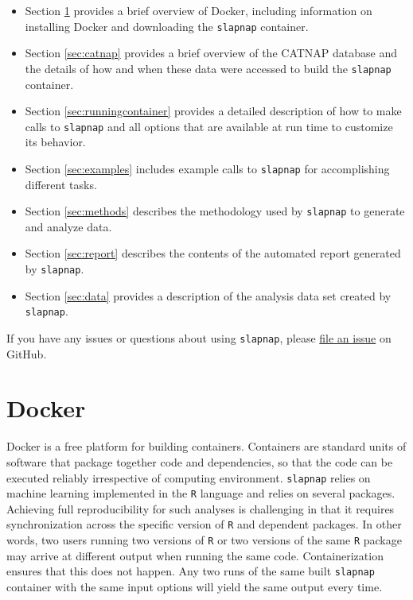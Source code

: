 \documentclass[]{article}
\providecommand{\tightlist}{%
  \setlength{\itemsep}{0pt}\setlength{\parskip}{0pt}}
\begin{document}
\begin{itemize}
\tightlist
\item
  Section \ref{sec:docker} provides a brief overview of Docker,
  including information on installing Docker and downloading the
  \texttt{slapnap} container.
\item
  Section \ref{sec:catnap} provides a brief overview of the CATNAP
  database and the details of how and when these data were accessed to
  build the \texttt{slapnap} container.
\item
  Section \ref{sec:runningcontainer} provides a detailed description of
  how to make calls to \texttt{slapnap} and all options that are
  available at run time to customize its behavior.
\item
  Section \ref{sec:examples} includes example calls to \texttt{slapnap}
  for accomplishing different tasks.
\item
  Section \ref{sec:methods} describes the methodology used by
  \texttt{slapnap} to generate and analyze data.
\item
  Section \ref{sec:report} describes the contents of the automated
  report generated by \texttt{slapnap}.
\item
  Section \ref{sec:data} provides a description of the analysis data set
  created by \texttt{slapnap}.
\end{itemize}

If you have any issues or questions about using \texttt{slapnap}, please
\href{https://github.com/benkeser/slapnap/issues}{file an issue} on
GitHub.

\section{Docker}\label{sec:docker}

Docker is a free platform for building containers. Containers are
standard units of software that package together code and dependencies,
so that the code can be executed reliably irrespective of computing
environment. \texttt{slapnap} relies on machine learning implemented in
the \texttt{R} language and relies on several packages. Achieving full
reproducibility for such analyses is challenging in that it requires
synchronization across the specific version of \texttt{R} and dependent
packages. In other words, two users running two versions of \texttt{R}
or two versions of the same \texttt{R} package may arrive at different
output when running the same code. Containerization ensures that this
does not happen. Any two runs of the same built \texttt{slapnap}
container with the same input options will yield the same output every
time.
\end{document}
